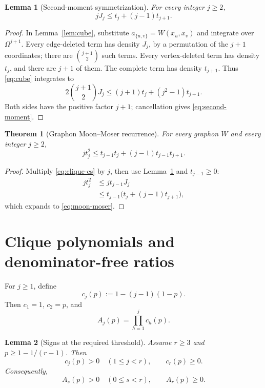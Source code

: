 \documentclass[11pt]{article}
\newtheorem{theorem}{Theorem}
\newtheorem{lemma}{Lemma}
\begin{document}
\begin{lemma}[Second-moment symmetrization]\label{lem:second-moment}
For every integer \(j\ge2\),
\begin{equation}\label{eq:second-moment}
    jJ_j\le t_j+(j-1)t_{j+1}.
\end{equation}
\end{lemma}

\begin{proof}
In Lemma~\ref{lem:cube}, substitute
\(a_{\{u,v\}}=W(x_u,x_v)\) and integrate over
\(\Omega^{j+1}\).  Every edge-deleted term has density \(J_j\), by a
permutation of the \(j+1\) coordinates; there are
\(\binom{j+1}{2}\) such terms.  Every vertex-deleted term has density \(t_j\),
and there are \(j+1\) of them.  The complete term has density \(t_{j+1}\).
Thus \eqref{eq:cube} integrates to
\[
    2\binom{j+1}{2}J_j
    \le
    (j+1)t_j+(j^2-1)t_{j+1}.
\]
Both sides have the positive factor \(j+1\); cancellation gives
\eqref{eq:second-moment}.
\end{proof}

\begin{theorem}[Graphon Moon--Moser recurrence]\label{thm:moon-moser}
For every graphon \(W\) and every integer \(j\ge2\),
\begin{equation}\label{eq:moon-moser}
    j t_j^2
    \le
    t_{j-1}t_j+(j-1)t_{j-1}t_{j+1}.
\end{equation}
\end{theorem}

\begin{proof}
Multiply \eqref{eq:clique-cs} by \(j\), then use
Lemma~\ref{lem:second-moment} and \(t_{j-1}\ge0\):
\[
\begin{aligned}
    jt_j^2
    &\le jt_{j-1}J_j\\
    &\le t_{j-1}\bigl(t_j+(j-1)t_{j+1}\bigr),
\end{aligned}
\]
which expands to \eqref{eq:moon-moser}.
\end{proof}

\section{Clique polynomials and denominator-free ratios}

For \(j\ge1\), define
\[
    c_j(p):=1-(j-1)(1-p).
\]
Then \(c_1=1\), \(c_2=p\), and
\[
    A_j(p)=\prod_{h=1}^{j}c_h(p).
\]

\begin{lemma}[Signs at the required threshold]\label{lem:factor-signs}
Assume \(r\ge3\) and \(p\ge1-1/(r-1)\).  Then
\[
    c_j(p)>0\quad(1\le j<r),
    \qquad
    c_r(p)\ge0.
\]
Consequently,
\[
    A_s(p)>0\quad(0\le s<r),
    \qquad
    A_r(p)\ge0.
\]
\end{lemma}
\end{document}
